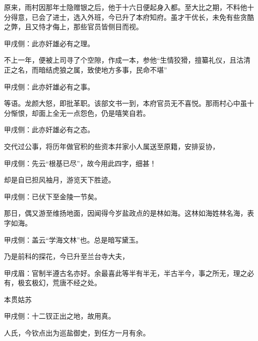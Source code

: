 \begin{parag}
    原来，雨村因那年士隐赠银之后，他于十六日便起身入都。至大比之期，不料他十分得意，已会了进士，选入外班，今已升了本府知府。虽才干优长，未免有些贪酷之弊，且又恃才侮上，那些官员皆侧目而视。\begin{note}甲戌侧：此亦奸雄必有之理。\end{note}不上一年，便被上司寻了个空隙，作成一本，参他“生情狡猾，擅纂礼仪，且沽清正之名，而暗结虎狼之属，致使地方多事，民命不堪”\begin{note}甲戌侧：此亦奸雄必有之事。\end{note}等语。龙颜大怒，即批革职。该部文书一到，本府官员无不喜悦。那雨村心中虽十分惭恨，却面上全无一点怨色，仍是嘻笑自若。\begin{note}甲戌侧：此亦奸雄必有之态。\end{note}交代过公事，将历年做官积的些资本幷家小人属送至原籍，安排妥协，\begin{note}甲戌侧：先云“根基已尽”，故今用此四字，细甚！\end{note}却是自已担风袖月，游览天下胜迹。\begin{note}甲戌侧：已伏下至金陵一节矣。\end{note}
\end{parag}


\begin{parag}
    那日，偶又游至维扬地面，因闻得今岁盐政点的是林如海。这林如海姓林名海，表字如海。\begin{note}甲戌侧：盖云“学海文林”也。总是暗写黛玉。\end{note}乃是前科的探花，今已升至兰台寺大夫，\begin{note}甲戌眉：官制半遵古名亦好。余最喜此等半有半无，半古半今，事之所无，理之必有，极玄极幻，荒唐不经之处。\end{note}本贯姑苏\begin{note}甲戌侧：十二钗正出之地，故用真。\end{note}人氏，今钦点出为巡盐御史，到任方一月有余。
\end{parag}


